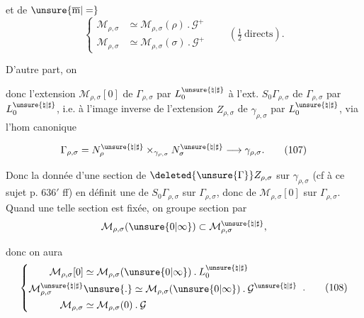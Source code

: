 et de $\unsure{\overline{\mathrm m}|=}$
\[
\left\{\begin{aligned}
\mathcal{M}_{\rho,\sigma}&\simeq\mathcal{M}_{\rho,\sigma}(\rho)\mathbin{.}\mathcal{G}^+\\
\mathcal{M}_{\rho,\sigma}&\simeq\mathcal{M}_{\rho,\sigma}(\sigma)\mathbin{.}\mathcal{G}^+
\end{aligned}\right.
\qquad(\tfrac12\ \text{directs}).
\tag{105}
\]

D'autre part, on 

donc l'extension $\mathcal{M}_{\rho,\sigma}[0]$ de $\Gamma_{\rho,\sigma}$ par $L_0^{\unsure{\natural|\sharp}}$  à l'ext. $S_0\Gamma_{\rho,\sigma}$ de $\Gamma_{\rho,\sigma}$ par $L_0^{\unsure{\natural|\sharp}}$, i.e. à l'image inverse de l'extension $Z_{\rho,\sigma}$ de $\gamma_{\rho,\sigma}$ par $L_0^{\unsure{\natural|\sharp}}$, via l'hom canonique




\[
\Gamma_{\rho,\sigma}
=N_\rho^{\unsure{\natural|\sharp}}\mathbin{\times}_{\gamma_{\rho,\sigma}}N_\sigma^{\unsure{\natural|\sharp}}
\longrightarrow\gamma_{\rho,\sigma}.
\tag{107}
\]

Donc la donnée d'une section de $\deleted{\unsure{\Gamma}}Z_{\rho,\sigma}$ sur $\gamma_{\rho,\sigma}$ (cf à ce sujet p. $636'$ ff) en définit une de $S_0\Gamma_{\rho,\sigma}$ sur $\Gamma_{\rho,\sigma}$, donc de $\mathcal{M}_{\rho,\sigma}[0]$ sur $\Gamma_{\rho,\sigma}$. Quand une telle section est fixée, on   groupe section par
\[
\mathcal{M}_{\rho,\sigma}(\unsure{0|\infty})
\subset\mathcal{M}_{\rho,\sigma}^{\unsure{\natural|\sharp}},
\]

donc on aura
\[
\left\{\begin{aligned}
\mathcal{M}_{\rho,\sigma}[0]
&\simeq\mathcal{M}_{\rho,\sigma}(\unsure{0|\infty})\mathbin{.}L_0^{\unsure{\natural|\sharp}}\\
\mathcal{M}_{\rho,\sigma}^{\unsure{\natural|\sharp}}
&\unsure{\mathbin{.}}\simeq\mathcal{M}_{\rho,\sigma}(\unsure{0|\infty})\mathbin{.}\mathcal{G}^{\unsure{\natural|\sharp}}\\
\mathcal{M}_{\rho,\sigma}
&\simeq\mathcal{M}_{\rho,\sigma}(0)\mathbin{.}\mathcal{G}
\end{aligned}\right.
\;.
\tag{108}
\]

